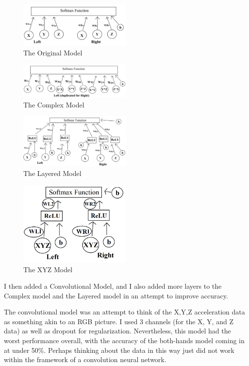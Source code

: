 \documentclass[]{report}
\begin{document}
\begin{figure}
	\centering
	\includegraphics[width=0.5\textwidth]{../images/original}
	\caption{The Original Model}
	\label{original-model}
\end{figure}
\begin{figure}
	\centering
	\includegraphics[width=0.5\textwidth]{../images/complex}
		\caption{The Complex Model}
	\label{complex-model}
\end{figure}
\begin{figure}
	\centering
	\includegraphics[width=0.5\textwidth]{../images/layered}
	\caption{The Layered Model}
	\label{layered-model}
\end{figure}
\begin{figure}
	\centering
	\includegraphics[width=0.5\textwidth]{../images/xyz1}
	\caption{The XYZ Model}
	\label{xyz-model}
\end{figure}

I then added a Convolutional Model, and I also added more layers to the Complex model and the Layered model in an attempt to improve accuracy.

The convolutional model was an attempt to think of the X,Y,Z acceleration data as something akin to an RGB picture. I used 3 channels (for the X, Y, and Z data) as well as dropout for regularization. Nevertheless, this model had the worst performance overall, with the accuracy of the both-hands model coming in at under 50\%. Perhaps thinking about the data in this way just did not work within the framework of a convolution neural network.
\end{document}
